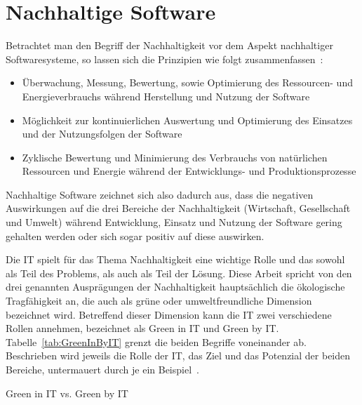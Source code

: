 \section{Nachhaltige Software}\label{CAP:sustainable-software}
Betrachtet man den Begriff der Nachhaltigkeit vor dem Aspekt nachhaltiger Softwaresysteme, so lassen sich die Prinzipien wie folgt zusammenfassen~\cite{Calero.2015}:
\begin{itemize}
 \item Überwachung, Messung, Bewertung, sowie Optimierung des Ressourcen- und Energieverbrauchs während Herstellung und Nutzung der Software
\item Möglichkeit zur kontinuierlichen Auswertung und Optimierung des Einsatzes und der Nutzungsfolgen der Software
\item Zyklische Bewertung und Minimierung des Verbrauchs von natürlichen Ressourcen und Energie während der Entwicklungs- und Produktionsprozesse
\end{itemize}
Nachhaltige Software zeichnet sich also dadurch aus, dass die negativen Auswirkungen auf die drei Bereiche der Nachhaltigkeit (Wirtschaft, Gesellschaft und Umwelt) während Entwicklung, Einsatz und Nutzung der Software gering gehalten werden oder sich sogar positiv auf diese auswirken.

\noindent Die \ac{IT} spielt für das Thema Nachhaltigkeit eine wichtige Rolle und das sowohl als Teil des Problems, als auch als Teil der Lösung.
Diese Arbeit spricht von den drei genannten Ausprägungen der Nachhaltigkeit hauptsächlich die ökologische Tragfähigkeit an, die auch als \glqq grüne\grqq{} oder \glqq umweltfreundliche\grqq{} Dimension bezeichnet wird.
Betreffend dieser Dimension kann die \ac{IT} zwei verschiedene Rollen annehmen, bezeichnet als Green in \ac{IT} und Green by \ac{IT}\@.
Tabelle~\ref{tab:GreenInByIT} grenzt die beiden Begriffe voneinander ab.
Beschrieben wird jeweils die Rolle der \ac{IT}, das Ziel und das Potenzial der beiden Bereiche, untermauert durch je ein Beispiel~\cite{Calero.2015}.

\begin{table}[t]
 \centering\small
 \caption{Green in IT vs. Green by IT}
 \label{tab:GreenInByIT}
 
\end{table}


